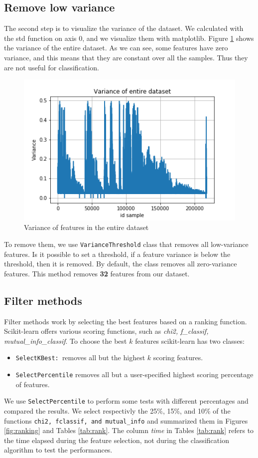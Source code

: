 \subsection{Remove low variance}
The second step is to visualize the variance of the dataset. We calculated with the std function on axis 0, and we visualize them with matplotlib. Figure \ref{fig:var_all} shows the variance of the entire dataset. As we can see, some features have zero variance, and this means that they are constant over all the samples. Thus they are not useful for classification.

\begin{figure}[!h]
	\centering
	\includegraphics[width=0.6\columnwidth]{variance-all.png}
	\caption{Variance of features in the entire dataset}
	\label{fig:var_all}
\end{figure}

To remove them, we use \texttt{VarianceThreshold} class that removes all low-variance features. Is it possible to set a threshold, if a feature variance is below the threshold, then it is removed. By default, the class removes all zero-variance features. This method removes \textbf{32} features from our dataset.

\subsection{Filter methods}

Filter methods work by selecting the best features based on a ranking function. Scikit-learn offers various scoring functions, such as \textit{chi2, f\_classif, mutual\_info\_classif}. To choose the best $k$ features scikit-learn has two classes:
\begin{itemize}
	\item \texttt{SelectKBest: }removes all but the highest $k$ scoring features.
	\item \texttt{SelectPercentile} removes all but a user-specified highest scoring percentage of features.
\end{itemize} 
We use \texttt{SelectPercentile} to perform some tests with different percentages and compared the results. 
We select respectivly the 25\%, 15\%, and 10\% of the functions \texttt{chi2, fclassif, and mutual\_info} and summarized them in Figures \ref{fig:ranking} and Tables \ref{tab:rank}. The column \textit{time} in Tables \ref{tab:rank} refers to the time elapsed during the feature selection, not during the classification algorithm to test the performances.

